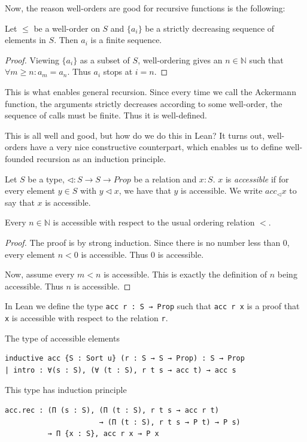 \documentclass[a4paper, 12pt]{article}
\newcommand{\N}{\mathbb{N}}
\newcommand{\Prop}{\mathit{Prop}}
\renewcommand{\Prop}{\mathit{Prop}}
\newcommand{\lean}[1]{\texttt{#1}}
\theoremstyle{changedot}
\theoremstyle{changedotbreak}
\theoremstyle{nonumberplain}
\newtheorem{proof}{Proof}
\begin{document}
Now, the reason well-orders are good for recursive functions is the following:

\begin{proposition}\label{thm:well_order_terminates}
  Let $\leq$ be a well-order on $S$ and $\{a_{i}\}$ be a strictly decreasing sequence of elements in $S$. Then $a_{i}$ is a finite sequence. 
\end{proposition}
\begin{proof}
  Viewing $\{a_{i}\}$ as a subset of $S$, well-ordering gives an $n \in \N$ such that $\forall m \geq n: a_{m} = a_{n}$. Thus $a_{i}$ stops at $i = n$.
\end{proof}

This is what enables general recursion. Since every time we call the Ackermann function, the arguments strictly decreases according to some well-order, the sequence of calls must be finite. Thus it is well-defined.

This is all well and good, but how do we do this in Lean? It turns out, well-orders have a very nice constructive counterpart, which enables us to define well-founded recursion as an induction principle.

\begin{definition}
  Let $S$ be a type, $\lhd : S \to S \to \Prop$ be a relation and $x : S$. $x$ is \textit{accessible} if for every element $y \in S$ with $y \lhd x$, we have that $y$ is accessible. We write $acc_{\lhd} x$ to say that $x$ is accessible.
\end{definition}

\begin{proposition}
  Every $n \in \N$ is accessible with respect to the usual ordering relation $<$.
\end{proposition}
\begin{proof}
  The proof is by strong induction. Since there is no number less than $0$, every element $n < 0$ is accessible. Thus $0$ is accessible.

  Now, assume every $m < n$ is accessible. This is exactly the definition of $n$ being accessible. Thus $n$ is accessible.
\end{proof}

In Lean we define the type \lean{acc r : S → Prop} such that \lean{acc r x} is a proof that \lean{x} is accessible with respect to the relation \lean{r}.

\begin{definition}
  The type of accessible elements
\begin{verbatim}
inductive acc {S : Sort u} (r : S → S → Prop) : S → Prop
| intro : ∀(s : S), (∀ (t : S), r t s → acc t) → acc s
\end{verbatim}

  This type has induction principle

\begin{verbatim}
acc.rec : (Π (s : S), (Π (t : S), r t s → acc r t)
                      → (Π (t : S), r t s → P t) → P s)
          → Π {x : S}, acc r x → P x
\end{verbatim}
\end{definition}
\end{document}
